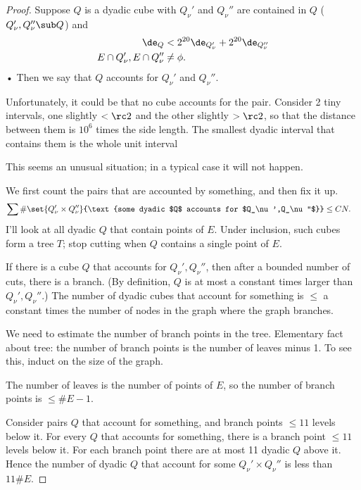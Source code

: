 \begin{proof}
Suppose $Q$ is a dyadic cube with $Q_\nu'$ and $Q_\nu''$ are contained in $Q$ ($Q_\nu',Q_\nu''\sub Q$) and
\begin{align}
\de_Q &< 2^{20} \de_{Q_\nu'} + 2^{20}\de_{Q_\nu''}\\
E\cap Q_\nu', E \cap Q_\nu'' &\ne \phi.
\end{align}•
Then we say that $Q$ accounts for $Q_\nu'$ and $Q_\nu''$. 

Unfortunately, it could be that no cube accounts for the pair.
Consider 2 tiny intervals, one slightly $<\rc2$ and the other slightly $>\rc 2$, so that the distance between them is $10^6$ times the side length. The smallest dyadic interval that contains them is the whole unit interval

This seems an unusual situation; in a typical case it will not happen.

We first count the pairs that are accounted by something, and then fix it up. 
\begin{align}
\sum \# \set{Q_\nu'\times Q_\nu''}{\text{some dyadic $Q$ accounts for $Q_\nu',Q_\nu''$}}
&\le CN.
\end{align}
I'll look at all dyadic $Q$ that contain points of $E$. Under inclusion, such cubes form a tree $T$; stop cutting when $Q$ contains a single point of $E$. %

If there is a cube $Q$ that accounts for $Q_\nu',Q_\nu''$, then after a bounded number of cuts, there is a branch. (By definition, $Q$ is at most a constant times larger than $Q_\nu',Q_\nu''$.)
The number of dyadic cubes that account for something is $\le $ a constant times the number of nodes in the graph where the graph branches. 

We need to estimate the number of branch points in the tree. Elementary fact about tree: the number of branch points is the number of leaves minus 1. To see this, induct on the size of the graph.

The number of leaves is the number of points of $E$, so the number of branch points is $\le \# E-1$.

Consider pairs $Q$ that account for something, and branch points $\le 11$ levels below it. For every $Q$ that accounts for something, there is a branch point $\le 11$ levels below it. For each branch point there are at most 11 dyadic $Q$ above it. 
 Hence the number of dyadic $Q$ that account for some $Q_\nu'\times Q_\nu''$ is less than $11\# E$.


\end{proof}
